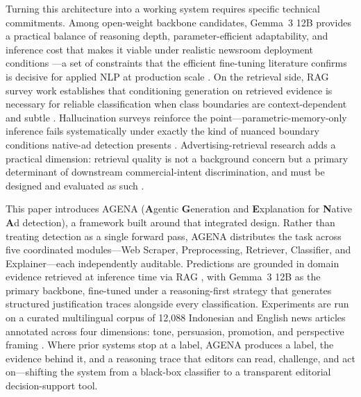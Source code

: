 \documentclass{ieeeaccess}
\begin{document}
Turning this architecture into a working system requires specific technical commitments. Among open-weight backbone candidates, Gemma~3 12B provides a practical balance of reasoning depth, parameter-efficient adaptability, and inference cost that makes it viable under realistic newsroom deployment conditions \cite{r16}—a set of constraints that the efficient fine-tuning literature confirms is decisive for applied NLP at production scale \cite{r17}. On the retrieval side, RAG survey work establishes that conditioning generation on retrieved evidence is necessary for reliable classification when class boundaries are context-dependent and subtle \cite{r18}. Hallucination surveys reinforce the point—parametric-memory-only inference fails systematically under exactly the kind of nuanced boundary conditions native-ad detection presents \cite{r19}. Advertising-retrieval research adds a practical dimension: retrieval quality is not a background concern but a primary determinant of downstream commercial-intent discrimination, and must be designed and evaluated as such \cite{r20}.

This paper introduces AGENA (\textbf{A}gentic \textbf{G}eneration and \textbf{E}xplanation for \textbf{N}ative \textbf{A}d detection), a framework built around that integrated design. Rather than treating detection as a single forward pass, AGENA distributes the task across five coordinated modules—Web Scraper, Preprocessing, Retriever, Classifier, and Explainer—each independently auditable. Predictions are grounded in domain evidence retrieved at inference time via RAG \cite{r21}, with Gemma~3 12B as the primary backbone, fine-tuned under a reasoning-first strategy that generates structured justification traces alongside every classification. Experiments are run on a curated multilingual corpus of 12,088 Indonesian and English news articles annotated across four dimensions: tone, persuasion, promotion, and perspective framing \cite{r7}. Where prior systems stop at a label, AGENA produces a label, the evidence behind it, and a reasoning trace that editors can read, challenge, and act on—shifting the system from a black-box classifier to a transparent editorial decision-support tool.
\end{document}
